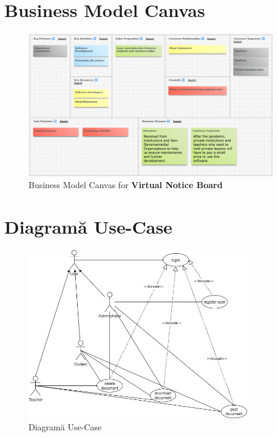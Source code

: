 \documentclass[12pt]{article}
\begin{document}
\section{Business Model Canvas}
\begin{figure}[h!]
	\centering
    	\includegraphics[width=0.95\textwidth]{businessCanvas.png}
        \caption{Business Model Canvas for \textbf{Virtual Notice Board}}
\end{figure}

\section{Diagramă Use-Case}
\begin{figure}[h!]
	\centering
    	\includegraphics[width=0.85\textwidth]{use_case.jpg}
        \caption{Diagramă Use-Case}
\end{figure}
\end{document}

